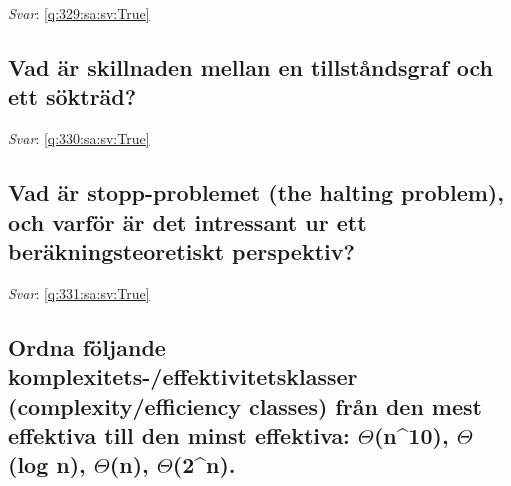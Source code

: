 \documentclass[a4paper,11pt,oneside]{article}
\begin{document}
\begin{sloppypar}
\noindent\makebox[\textwidth]{\hrulefill}

\vspace{1cm}

\textit{Svar}: \autoref{q:329:sa:sv:True}



\subsection{Vad \"ar skillnaden mellan en tillst\r{a}ndsgraf och ett s\"oktr\"ad?}

\label{q:330:sa:sv:False}

\vspace{2cm}

\noindent\makebox[\textwidth]{\hrulefill}

\vspace{1cm}

\textit{Svar}: \autoref{q:330:sa:sv:True}



\subsection{Vad \"ar stopp-problemet (the halting problem), och varf\"or \"ar det intressant ur ett ber\"akningsteoretiskt perspektiv?}

\label{q:331:sa:sv:False}

\vspace{2cm}

\noindent\makebox[\textwidth]{\hrulefill}

\vspace{1cm}

\textit{Svar}: \autoref{q:331:sa:sv:True}



\subsection{Ordna f\"oljande komplexitets-/effektivitetsklasser (complexity/efficiency classes) fr\r{a}n den mest effektiva till den minst effektiva: \ensuremath{\Theta}(n^10), \ensuremath{\Theta}(log n), \ensuremath{\Theta}(n), \ensuremath{\Theta}(2^n).}

\label{q:332:sa:sv:False}

\vspace{2cm}

\noindent\makebox[\textwidth]{\hrulefill}

\vspace{1cm}


\end{sloppypar}
\end{document}
